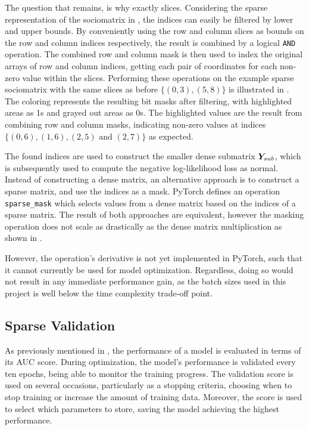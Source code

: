         The question that remains, is why exactly slices. Considering the sparse representation of the sociomatrix in , the indices can easily be filtered by lower and upper bounds. By conveniently using the row and column slices as bounds on the row and column indices respectively, the result is combined by a logical \texttt{AND} operation. The combined row and column mask is then used to index the original arrays of row and column indices, getting each pair of coordinates for each non-zero value within the slices. Performing these operations on the example sparse sociomatrix with the same slices as before $\{(0,3), (5,8)\}$ is illustrated in . The coloring represents the resulting bit masks after filtering, with highlighted areas as 1s and grayed out areas as 0s. The highlighted values are the result from combining row and column masks, indicating non-zero values at indices $\{(0,6),(1,6),(2,5) \text{ and } (2,7)\}$ as expected.
        
        The found indices are used to construct the smaller dense submatrix $\bm{Y}_{sub}$, which is subsequently used to compute the negative log-likelihood loss as normal.
        Instead of constructing a dense matrix, an alternative approach is to construct a sparse matrix, and use the indices as a mask. PyTorch defines an operation \texttt{sparse\_mask} which selects values from a dense matrix based on the indices of a sparse matrix. The result of both approaches are equivalent, however the masking operation does not scale as drastically as the dense matrix multiplication as shown in .
        
        However, the operation's derivative is not yet implemented in PyTorch, such that it cannot currently be used for model optimization. Regardless, doing so would not result in any immediate performance gain, as the batch sizes used in this project is well below the time complexity trade-off point.
        
\subsection{Sparse Validation}

    As previously mentioned in , the performance of a model is evaluated in terms of its AUC score. During optimization, the model's performance is validated every ten epochs, being able to monitor the training progress. The validation score is used on several occasions, particularly as a stopping criteria, choosing when to stop training or increase the amount of training data. Moreover, the score is used to select which parameters to store, saving the model achieving the highest performance.
    
